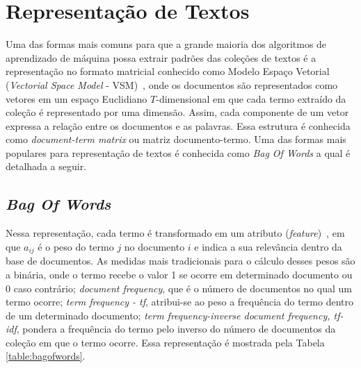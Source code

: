 \section{Representação de Textos} \label{section:RepTextos}


Uma das formas mais comuns para que a grande maioria dos algoritmos de aprendizado de máquina possa extrair padrões das coleções de textos é a representação no formato matricial conhecido como Modelo Espaço Vetorial (\textit{Vectorial Space Model} - VSM)~\cite{Rezende2003}, onde os documentos são representados como vetores em um espaço Euclidiano $T$-dimensional em que cada termo extraído da coleção é representado por uma dimensão. Assim, cada componente de um vetor expressa a relação entre os documentos e as palavras. Essa estrutura é conhecida como \textit{document-term matrix} ou matriz documento-termo. Uma das formas mais populares para representação de textos é conhecida como \textit{Bag Of Words} a qual é detalhada a seguir.
	

\subsection{\textit{Bag Of Words}} \label{subsubsec:BOW}
		
Nessa representação, cada termo é transformado em um atributo  (\textit{feature})~\cite{Rezende2003}, em que $a_{ij}$ é o peso do termo $j$ no documento $i$ e indica a sua relevância dentro da base de documentos. As medidas mais tradicionais para o cálculo desses pesos são a binária, onde o termo recebe o valor 1 se ocorre em determinado documento ou 0 caso contrário; \textit{document frequency}, que é o número de documentos no qual um termo ocorre; \textit{term frequency - tf}, atribui-se ao peso a frequência do termo dentro de um determinado documento; \textit{term frequency-inverse document frequency, tf-idf}, pondera a frequência do termo pelo inverso do número de documentos da coleção em que o termo ocorre.
Essa representação é mostrada pela Tabela \ref{table:bagofwords}.

